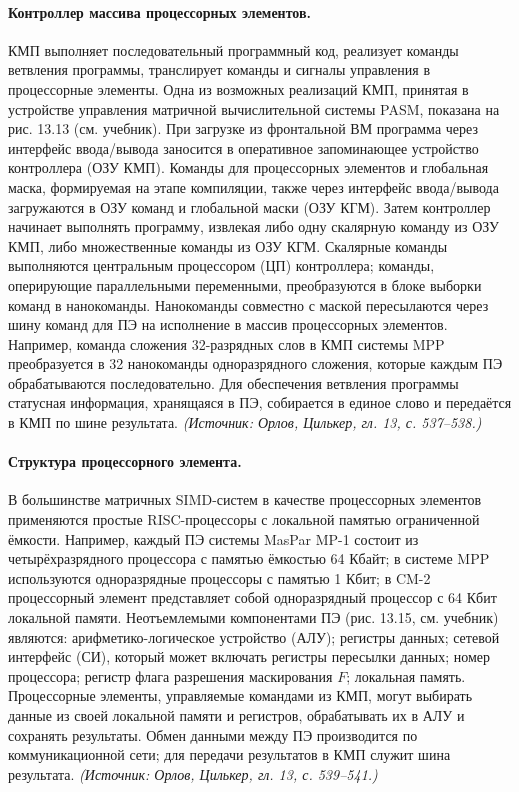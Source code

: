 \documentclass[a4paper,12pt]{article}
\begin{document}
\paragraph{Контроллер массива процессорных элементов.}
КМП выполняет последовательный программный код, реализует команды ветвления программы, транслирует команды и сигналы управления в процессорные элементы. Одна из возможных реализаций КМП, принятая в устройстве управления матричной вычислительной системы PASM, показана на рис. 13.13 (см. учебник). При загрузке из фронтальной ВМ программа через интерфейс ввода/вывода заносится в оперативное запоминающее устройство контроллера (ОЗУ КМП). Команды для процессорных элементов и глобальная маска, формируемая на этапе компиляции, также через интерфейс ввода/вывода загружаются в ОЗУ команд и глобальной маски (ОЗУ КГМ). Затем контроллер начинает выполнять программу, извлекая либо одну скалярную команду из ОЗУ КМП, либо множественные команды из ОЗУ КГМ. Скалярные команды выполняются центральным процессором (ЦП) контроллера; команды, оперирующие параллельными переменными, преобразуются в блоке выборки команд в нанокоманды. Нанокоманды совместно с маской пересылаются через шину команд для ПЭ на исполнение в массив процессорных элементов. Например, команда сложения 32-разрядных слов в КМП системы MPP преобразуется в 32 нанокоманды одноразрядного сложения, которые каждым ПЭ обрабатываются последовательно. Для обеспечения ветвления программы статусная информация, хранящаяся в ПЭ, собирается в единое слово и передаётся в КМП по шине результата.
\textit{(Источник: Орлов, Цилькер, гл. 13, с. 537--538.)}

\paragraph{Структура процессорного элемента.}
В большинстве матричных SIMD-систем в качестве процессорных элементов применяются простые RISC-процессоры с локальной памятью ограниченной ёмкости. Например, каждый ПЭ системы MasPar MP-1 состоит из четырёхразрядного процессора с памятью ёмкостью 64 Кбайт; в системе MPP используются одноразрядные процессоры с памятью 1 Кбит; в CM-2 процессорный элемент представляет собой одноразрядный процессор с 64 Кбит локальной памяти. Неотъемлемыми компонентами ПЭ (рис. 13.15, см. учебник) являются: арифметико-логическое устройство (АЛУ); регистры данных; сетевой интерфейс (СИ), который может включать регистры пересылки данных; номер процессора; регистр флага разрешения маскирования \(F\); локальная память. Процессорные элементы, управляемые командами из КМП, могут выбирать данные из своей локальной памяти и регистров, обрабатывать их в АЛУ и сохранять результаты. Обмен данными между ПЭ производится по коммуникационной сети; для передачи результатов в КМП служит шина результата.
\textit{(Источник: Орлов, Цилькер, гл. 13, с. 539--541.)}
\end{document}
